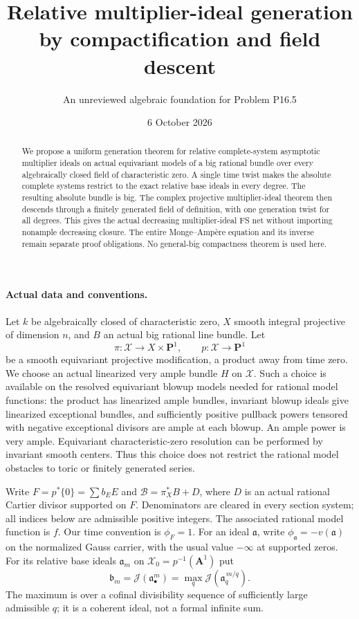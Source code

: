 \documentclass[10pt]{article}
\title{Relative multiplier-ideal generation by compactification and field descent}
\author{An unreviewed algebraic foundation for Problem P16.5}
\date{6 October 2026}
\newcommand{\J}{\mathcal J}
\begin{document}
\maketitle
\begin{abstract}
We propose a uniform generation theorem for relative complete-system
asymptotic multiplier ideals on actual equivariant models of a big
rational bundle over every algebraically closed field of characteristic
zero. A single time twist makes the absolute complete systems restrict
to the exact relative base ideals in every degree. The resulting absolute
bundle is big. The complex projective multiplier-ideal theorem then
descends through a finitely generated field of definition, with one
generation twist for all degrees. This gives the actual decreasing
multiplier-ideal FS net without importing nonample decreasing closure.
The entire Monge--Amp\`ere equation and its inverse remain separate
proof obligations. No general-big compactness theorem is used here.
\end{abstract}

\paragraph{Actual data and conventions.}
Let $k$ be algebraically closed of characteristic zero, $X$ smooth
integral projective of dimension $n$, and $B$ an actual big rational
line bundle. Let
\[
 \pi:\mathcal X\longrightarrow X\times\mathbf P^1,
 \qquad p:\mathcal X\longrightarrow\mathbf P^1
\]
be a smooth equivariant projective modification, a product away from
time zero. We choose an actual linearized very ample bundle $H$ on
$\mathcal X$. Such a choice is available on the resolved equivariant
blowup models needed for rational model functions: the product has
linearized ample bundles, invariant blowup ideals give linearized
exceptional bundles, and sufficiently positive pullback powers tensored
with negative exceptional divisors are ample at each blowup. An ample
power is very ample. Equivariant characteristic-zero resolution can be
performed by invariant smooth centers. Thus this choice does not restrict
the rational model obstacles to toric or finitely generated series.

Write $F=p^*\{0\}=\sum b_EE$ and
$\mathcal B=\pi_X^*B+D$, where $D$ is an actual rational Cartier
divisor supported on $F$. Denominators are cleared in every section
system; all indices below are admissible positive integers. The
associated rational model function is $f$. Our time convention is
$\phi_F=1$. For an ideal $\mathfrak a$, write
$\phi_{\mathfrak a}=-v(\mathfrak a)$ on the normalized Gauss carrier,
with the usual value $-\infty$ at supported zeros. For its relative base
ideals $\mathfrak a_m$ on $\mathcal X_0=p^{-1}(\mathbf A^1)$ put
\[
 \mathfrak b_m=\J(\mathfrak a_\bullet^m)
   =\max_q\J(\mathfrak a_q^{\,m/q}).                    \tag{1}
\]
The maximum is over a cofinal divisibility sequence of sufficiently
large admissible $q$; it is a coherent ideal, not a formal infinite sum.
\end{document}
